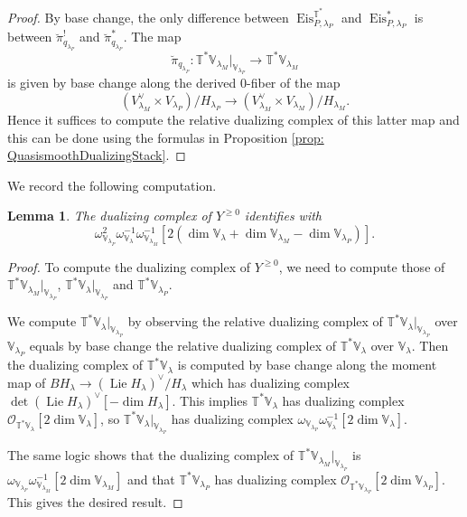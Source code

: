 \documentclass{amsart}
\newtheorem{lemma}[theorem]{Lemma}
\theoremstyle{definition}
\theoremstyle{remark}
\numberwithin{equation}{section}
\DeclareMathOperator{\Lie}{Lie}
\newcommand{\mc}{\mathcal}
\DeclareMathOperator{\Eis}{\mathrm{Eis}}
\newcommand{\V}{\mathbb{V}}
\newcommand{\T}{\mathbb{T}}
\begin{document}
\begin{proof}
    By base change, the only difference between $\Eis^{\T^{\ast}}_{P,\lambda_P}$ and $\Eis^{\ast}_{P,\lambda_P}$ is between $\breve{\pi}^!_{q_{\lambda_P}}$ and $\breve{\pi}^{\ast}_{q_{\lambda_P}}$.  The map
    \begin{equation*}
\breve{\pi}_{q_{\lambda_P}}\colon \T^{\ast}\V_{\lambda_M}|_{\V_{\lambda_P}} \rightarrow \T^{\ast}\V_{\lambda_M}
    \end{equation*}
is given by base change along the derived $0$-fiber of the map
\begin{equation*}
    (V^{\vee}_{\lambda_M} \times V_{\lambda_P}) / H_{\lambda_P} \rightarrow (V^{\vee}_{\lambda_M} \times V_{\lambda_M})/ H_{\lambda_M}.
\end{equation*}
Hence it suffices to compute the relative dualizing complex of this latter map and this can be done using the formulas in Proposition \ref{prop: QuasismoothDualizingStack}.
\end{proof}
We record the following computation.
\begin{lemma}{\label{lem: TVgeqdualizingcomputation}}
The dualizing complex of $Y^{\geq 0}$ identifies with 
\[
\omega_{\V_{\lambda_P}}^2 \omega_{\V_{\lambda}}^{-1}\omega_{\V_{\lambda_M}}^{-1}[2(\dim \V_{\lambda} + \dim \V_{\lambda_M} - \dim \V_{\lambda_P})].
\]
\end{lemma}
\begin{proof}
   To compute the dualizing complex of $Y^{\geq 0}$, we need to compute those of $\T^{\ast}\V_{\lambda_M}|_{\V_{\lambda_P}}$, $\T^{\ast}\V_{\lambda}|_{\V_{\lambda_P}}$ and $\T^{\ast}\V_{\lambda_P}$.

   We compute $\T^{\ast}\V_{\lambda}|_{\V_{\lambda_P}}$ by observing the relative dualizing complex of $\T^{\ast}\V_{\lambda}|_{\V_{\lambda_P}}$ over $\V_{\lambda_P}$ equals by base change the relative dualizing complex of $\T^{\ast}\V_{\lambda}$ over $\V_{\lambda}$. Then the dualizing complex of $\T^{\ast}\V_{\lambda}$ is computed by base change along the moment map of $BH_\lambda \to (\Lie H_\lambda)^\vee /H_\lambda$ which has dualizing complex $\det(\Lie H_{\lambda})^{\vee}[-\dim H_{\lambda}]$. This implies $\T^{\ast}\V_{\lambda}$ has dualizing complex $\mc{O}_{\T^{\ast}\V_{\lambda}}[2 \dim \V_{\lambda}]$, so $\T^{\ast}\V_{\lambda}|_{\V_{\lambda_P}}$ has dualizing complex $\omega_{\V_{\lambda_P}}\omega^{-1}_{\V_{\lambda}}[2 \dim \V_{\lambda}]$.

   The same logic shows that the dualizing complex of $\T^{\ast}\V_{\lambda_M}|_{\V_{\lambda_P}}$ is $\omega_{\V_{\lambda_P}}\omega^{-1}_{\V_{\lambda_M}}[2 \dim \V_{\lambda_M}]$ and that $\T^{\ast}\V_{\lambda_P}$ has dualizing complex $\mc{O}_{\T^{\ast}\V_{\lambda_P}}[2 \dim \V_{\lambda_P}]$. This gives the desired result.
\end{proof}
\end{document}
